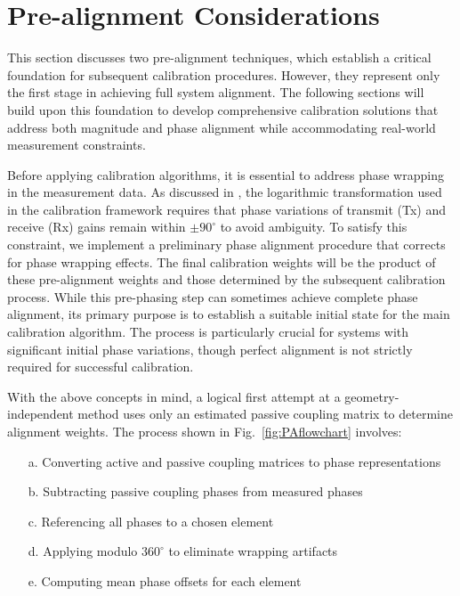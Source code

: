 \documentclass[journal]{IEEEtran}
\begin{document}
 

\section{Pre-alignment Considerations}

This section discusses two pre-alignment techniques, which establish a critical foundation for subsequent calibration procedures. However, they represent only the first stage in achieving full system alignment. The following sections will build upon this foundation to develop comprehensive calibration solutions that address both magnitude and phase alignment while accommodating real-world measurement constraints.



Before applying calibration algorithms, it is essential to address phase wrapping in the measurement data. As discussed in \cite{bekers,javier,sasser}, the logarithmic transformation used in the calibration framework requires that phase variations of transmit (Tx) and receive (Rx) gains remain within $\pm 90^\circ$ to avoid ambiguity. To satisfy this constraint, we implement a preliminary phase alignment procedure that corrects for phase wrapping effects. The final calibration weights will be the product of these pre-alignment weights and those determined by the subsequent calibration process.
While this pre-phasing step can sometimes achieve complete phase alignment, its primary purpose is to establish a suitable initial state for the main calibration algorithm. The process is particularly crucial for systems with significant initial phase variations, though perfect alignment is not strictly required for successful calibration.


With the above concepts in mind, a logical first attempt at a geometry-independent method uses only an estimated passive coupling matrix to determine alignment weights. The process shown in Fig.~\ref{fig:PAflowchart} involves:

\begin{enumerate}
    \item[a.] Converting active and passive coupling matrices to phase representations
    \item[b.] Subtracting passive coupling phases from measured phases
    \item[c.] Referencing all phases to a chosen element
    \item[d.] Applying modulo $360^\circ$ to eliminate wrapping artifacts
    \item[e.] Computing mean phase offsets for each element
\end{enumerate}
\end{document}
